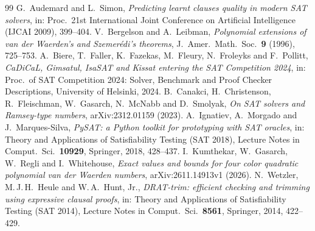 \documentclass[11pt,colorlinks]{charlie}
\begin{document}
\begin{thebibliography}{99}\small
{} G.~Audemard and L.~Simon, \emph{Predicting learnt clauses quality in modern SAT solvers}, in: Proc.\ 21st International Joint Conference on Artificial Intelligence (IJCAI 2009), 399--404.
 V.~Bergelson and A.~Leibman, \emph{Polynomial extensions of van der Waerden's and Szemer\'edi's theorems}, J.\ Amer.\ Math.\ Soc.\ \textbf{9} (1996), 725--753.
 A.~Biere, T.~Faller, K.~Fazekas, M.~Fleury, N.~Froleyks and F.~Pollitt, \emph{CaDiCaL, Gimsatul, IsaSAT and Kissat entering the SAT Competition 2024}, in: Proc.\ of SAT Competition 2024: Solver, Benchmark and Proof Checker Descriptions, University of Helsinki, 2024.
 B.~Canakci, H.~Christenson, R.~Fleischman, W.~Gasarch, N.~McNabb and D.~Smolyak, \emph{On SAT solvers and Ramsey-type numbers}, arXiv:2312.01159 (2023).
 A.~Ignatiev, A.~Morgado and J.~Marques-Silva, \emph{PySAT: a Python toolkit for prototyping with SAT oracles}, in: Theory and Applications of Satisfiability Testing (SAT 2018), Lecture Notes in Comput.\ Sci.\ \textbf{10929}, Springer, 2018, 428--437.
 I.~Kumthekar, W.~Gasarch, W.~Regli and I.~Whitehouse, \emph{Exact values and bounds for four color quadratic polynomial van der Waerden numbers}, arXiv:2611.14913v1 (2026).
 N.~Wetzler, M.\,J.\,H.~Heule and W.\,A.~Hunt, Jr., \emph{DRAT-trim: efficient checking and trimming using expressive clausal proofs}, in: Theory and Applications of Satisfiability Testing (SAT 2014), Lecture Notes in Comput.\ Sci.\ \textbf{8561}, Springer, 2014, 422--429.
\end{thebibliography}
\end{document}
